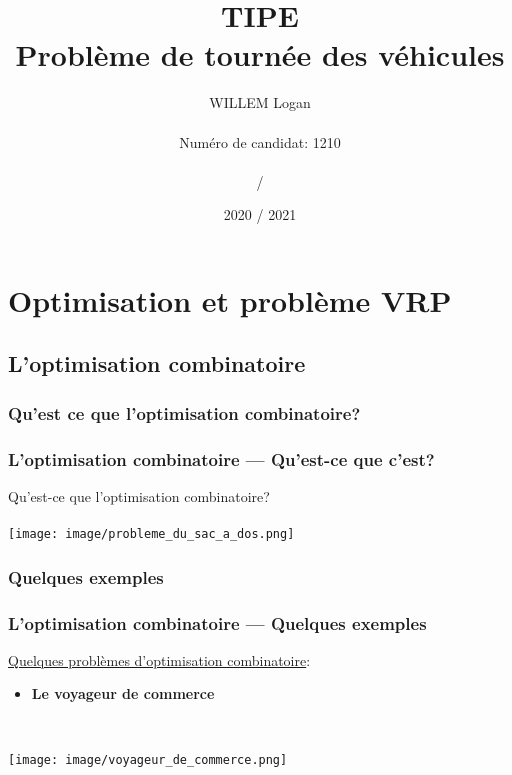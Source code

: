 \documentclass[10pt]{beamer}
\title[TIPE — Problème de tournée des véhicules]{TIPE \\ Problème de tournée des véhicules}
\author{WILLEM Logan \\ \  \\Numéro de candidat: 1210 \\ \  \\ \insertframenumber / \inserttotalframenumber}
\date{2020 / 2021}
\begin{document}
	\begin{frame}[plain]
		\maketitle
	\end{frame}

	\begin{frame}[plain]
		\tableofcontents
	\end{frame}

	\section{Optimisation et problème VRP}
	   
	\subsection{L'optimisation combinatoire}
	\subsubsection{Qu'est ce que l'optimisation combinatoire?}
	\begin{frame}
		\frametitle{L'optimisation combinatoire — Qu'est-ce que c'est?}
		\begin{center}
			Qu'est-ce que l'optimisation combinatoire? \\ \  \\
			\texttt{[image: image/probleme\_du\_sac\_a\_dos.png]}
		\end{center}
	\end{frame}
	
	\subsubsection{Quelques exemples}

	\begin{frame}
		\frametitle{L'optimisation combinatoire — Quelques exemples}
		\underline{Quelques problèmes d'optimisation combinatoire}:
		\pause%
		\begin{itemize}[label=—]
			\item \textbf{Le voyageur de commerce}
		\end{itemize}
		\  \\
		\begin{center}
			\texttt{[image: image/voyageur\_de\_commerce.png]}
		\end{center}
	\end{frame}
\end{document}

